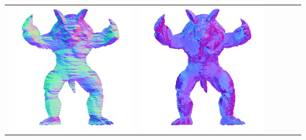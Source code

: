 \begin{tabularx}{\linewidth}{@{}Y@{}Y@{}Y@{}Y@{}Y@{}Y@{}}
\includegraphics[width=\linewidth]{semisynthetic/20150514_22_yu_out.png} &
\includegraphics[width=\linewidth]{semisynthetic/20150514_22_dpsn_out.png} &

\end{tabularx}
